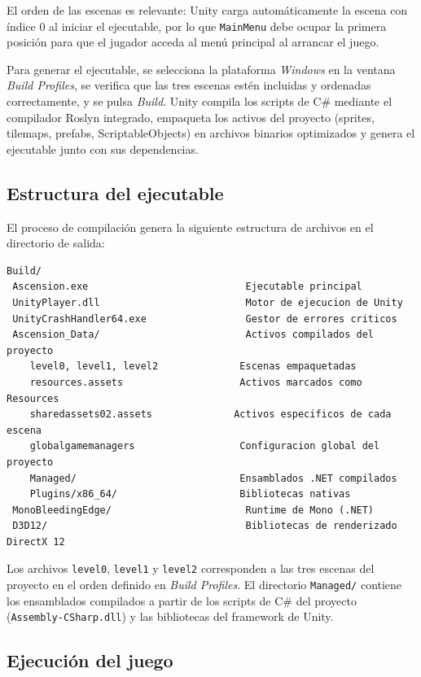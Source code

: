 El orden de las escenas es relevante: Unity carga automáticamente la escena con índice 0 al iniciar el ejecutable, por lo que \texttt{MainMenu} debe ocupar la primera posición para que el jugador acceda al menú principal al arrancar el juego.

Para generar el ejecutable, se selecciona la plataforma \textit{Windows} en la ventana \textit{Build Profiles}, se verifica que las tres escenas estén incluidas y ordenadas correctamente, y se pulsa \textit{Build}. Unity compila los scripts de C\# mediante el compilador Roslyn integrado, empaqueta los activos del proyecto (sprites, tilemaps, prefabs, ScriptableObjects) en archivos binarios optimizados y genera el ejecutable junto con sus dependencias.

\subsection{Estructura del ejecutable}


El proceso de compilación genera la siguiente estructura de archivos en el directorio de salida:

\begin{lstlisting}
Build/
 Ascension.exe                           Ejecutable principal
 UnityPlayer.dll                         Motor de ejecucion de Unity
 UnityCrashHandler64.exe                 Gestor de errores criticos
 Ascension_Data/                         Activos compilados del proyecto
    level0, level1, level2              Escenas empaquetadas
    resources.assets                    Activos marcados como Resources
    sharedassets02.assets              Activos especificos de cada escena
    globalgamemanagers                  Configuracion global del proyecto
    Managed/                            Ensamblados .NET compilados
    Plugins/x86_64/                     Bibliotecas nativas
 MonoBleedingEdge/                       Runtime de Mono (.NET)
 D3D12/                                  Bibliotecas de renderizado DirectX 12
\end{lstlisting}


Los archivos \texttt{level0}, \texttt{level1} y \texttt{level2} corresponden a las tres escenas del proyecto en el orden definido en \textit{Build Profiles}. El directorio \texttt{Managed/} contiene los ensamblados compilados a partir de los scripts de C\# del proyecto (\texttt{Assembly-CSharp.dll}) y las bibliotecas del framework de Unity.

\subsection{Ejecución del juego}


